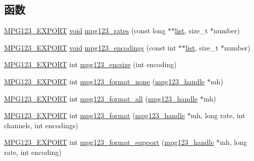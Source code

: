 \subsection*{函数}
\begin{DoxyCompactItemize}
\item 
\hyperlink{mpg123_8h_a2ba98cfba3f760879df70e755b2a61cc}{M\+P\+G123\+\_\+\+E\+X\+P\+O\+RT} \hyperlink{interfacevoid}{void} \hyperlink{group__mpg123__output_gac01392beb95e85d2ba165d4a3630f52a}{mpg123\+\_\+rates} (const long $\ast$$\ast$\hyperlink{classlist}{list}, size\+\_\+t $\ast$number)
\item 
\hyperlink{mpg123_8h_a2ba98cfba3f760879df70e755b2a61cc}{M\+P\+G123\+\_\+\+E\+X\+P\+O\+RT} \hyperlink{interfacevoid}{void} \hyperlink{group__mpg123__output_gabdf7009c888364527de2bdf37aa36185}{mpg123\+\_\+encodings} (const int $\ast$$\ast$\hyperlink{classlist}{list}, size\+\_\+t $\ast$number)
\item 
\hyperlink{mpg123_8h_a2ba98cfba3f760879df70e755b2a61cc}{M\+P\+G123\+\_\+\+E\+X\+P\+O\+RT} int \hyperlink{group__mpg123__output_gaf12bd45d9040973c8c7b7b9411a530b5}{mpg123\+\_\+encsize} (int encoding)
\item 
\hyperlink{mpg123_8h_a2ba98cfba3f760879df70e755b2a61cc}{M\+P\+G123\+\_\+\+E\+X\+P\+O\+RT} int \hyperlink{group__mpg123__output_ga931ca238347de394901c3baa13e7a8f8}{mpg123\+\_\+format\+\_\+none} (\hyperlink{group__mpg123__init_ga6728e2839a395f3a07d4514da659faca}{mpg123\+\_\+handle} $\ast$mh)
\item 
\hyperlink{mpg123_8h_a2ba98cfba3f760879df70e755b2a61cc}{M\+P\+G123\+\_\+\+E\+X\+P\+O\+RT} int \hyperlink{group__mpg123__output_ga65a28420ccab9021abd44ae95db8b1b6}{mpg123\+\_\+format\+\_\+all} (\hyperlink{group__mpg123__init_ga6728e2839a395f3a07d4514da659faca}{mpg123\+\_\+handle} $\ast$mh)
\item 
\hyperlink{mpg123_8h_a2ba98cfba3f760879df70e755b2a61cc}{M\+P\+G123\+\_\+\+E\+X\+P\+O\+RT} int \hyperlink{group__mpg123__output_gadad5794afc300a997e517dbe397dc2c7}{mpg123\+\_\+format} (\hyperlink{group__mpg123__init_ga6728e2839a395f3a07d4514da659faca}{mpg123\+\_\+handle} $\ast$mh, long rate, int channels, int encodings)
\item 
\hyperlink{mpg123_8h_a2ba98cfba3f760879df70e755b2a61cc}{M\+P\+G123\+\_\+\+E\+X\+P\+O\+RT} int \hyperlink{group__mpg123__output_gae30accfd052c88aad47820c5bb149cda}{mpg123\+\_\+format\+\_\+support} (\hyperlink{group__mpg123__init_ga6728e2839a395f3a07d4514da659faca}{mpg123\+\_\+handle} $\ast$mh, long rate, int encoding)
\item 

\end{DoxyCompactItemize}

